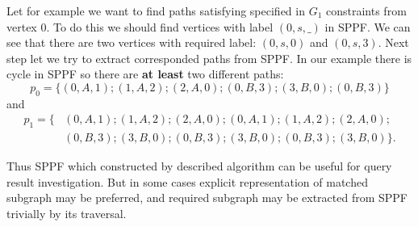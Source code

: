 Let for example we want to find paths satisfying specified in $G_1$ constraints from vertex $0$.
To do this we should find vertices with label $(0, s, \_)$ in SPPF.
We can see that there are two vertices with required label: $(0, s, 0)$ and $(0, s, 3)$.
Next step let we try to extract corresponded paths from SPPF.
In our example there is cycle in SPPF so there are \textbf{at least} two different paths: $$p_0=\{(0,A,1);(1,A,2);(2,A,0);(0,B,3);(3,B,0);(0,B,3)\}$$ and 
\begin{align*}
p_1=\{&(0,A,1);(1,A,2);(2,A,0);(0,A,1);(1,A,2);(2,A,0);\\ &(0,B,3);(3,B,0);(0,B,3);(3,B,0);(0,B,3);(3,B,0)\}.
\end{align*}


Thus SPPF which constructed by described algorithm can be useful for query result investigation. 
But in some cases explicit representation of matched subgraph may be preferred, and required subgraph may be extracted from SPPF trivially by its traversal.
